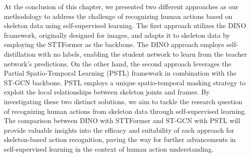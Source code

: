 At the conclusion of this chapter, we presented two different approaches as our methodology to address the challenge of recognizing human actions based on skeleton data using self-supervised learning. The first approach utilizes the DINO framework, originally designed for images, and adapts it to skeleton data by employing the STTFormer as the backbone. The DINO approach employs self-distillation with no labels, enabling the student network to learn from the teacher network's predictions. On the other hand, the second approach leverages the Partial Spatio-Temporal Learning (PSTL) framework in combination with the ST-GCN backbone. PSTL employs a unique spatio-temporal masking strategy to exploit the local relationships between skeleton joints and frames. By investigating these two distinct solutions, we aim to tackle the research question of recognizing human actions from skeleton data through self-supervised learning. The comparison between DINO with STTFormer and ST-GCN with PSTL will provide valuable insights into the efficacy and suitability of each approach for skeleton-based action recognition, paving the way for further advancements in self-supervised learning in the context of human action understanding.